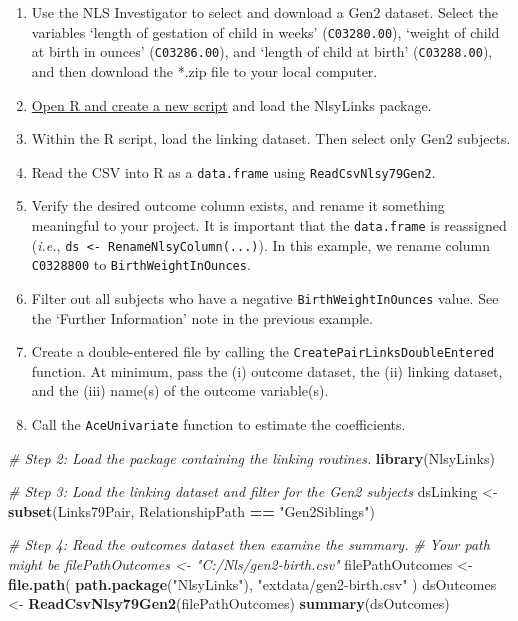 \documentclass[smallextended]{svjour3}       %
\newenvironment{Shaded}{\begin{snugshade}}{\end{snugshade}}
\newcommand{\CommentTok}[1]{\textcolor[rgb]{0.56,0.35,0.01}{\textit{#1}}}
\newcommand{\KeywordTok}[1]{\textcolor[rgb]{0.13,0.29,0.53}{\textbf{#1}}}
\newcommand{\NormalTok}[1]{#1}
\newcommand{\OperatorTok}[1]{\textcolor[rgb]{0.81,0.36,0.00}{\textbf{#1}}}
\newcommand{\StringTok}[1]{\textcolor[rgb]{0.31,0.60,0.02}{#1}}
\begin{document}
\begin{enumerate}
\def\labelenumi{\arabic{enumi}.}
\item
  Use the NLS Investigator to select and download a Gen2 dataset. Select
  the variables `length of gestation of child in weeks'
  (\texttt{C03280.00}), `weight of child at birth in ounces'
  (\texttt{C03286.00}), and `length of child at birth'
  (\texttt{C03288.00}), and then download the *.zip file to your local
  computer.
\item
  \protect\hyperlink{appendix-creating-and-saving-r-scripts}{Open R and
  create a new script} and load the NlsyLinks package.
\item
  Within the R script, load the linking dataset. Then select only Gen2
  subjects.
\item
  Read the CSV into R as a \texttt{data.frame} using
  \texttt{ReadCsvNlsy79Gen2}.
\item
  Verify the desired outcome column exists, and rename it something
  meaningful to your project. It is important that the
  \texttt{data.frame} is reassigned (\emph{i.e.},
  \texttt{ds\ \textless{}-\ RenameNlsyColumn(...)}). In this example, we
  rename column \texttt{C0328800} to \texttt{BirthWeightInOunces}.
\item
  Filter out all subjects who have a negative
  \texttt{BirthWeightInOunces} value. See the `Further Information' note
  in the previous example.
\item
  Create a double-entered file by calling the
  \texttt{CreatePairLinksDoubleEntered} function. At minimum, pass the
  (i) outcome dataset, the (ii) linking dataset, and the (iii) name(s)
  of the outcome variable(s).
\item
  Call the \texttt{AceUnivariate} function to estimate the coefficients.
\end{enumerate}

\begin{Shaded}
\begin{Highlighting}[]
\CommentTok{# Step 2: Load the package containing the linking routines.}
\KeywordTok{library}\NormalTok{(NlsyLinks)}

\CommentTok{# Step 3: Load the linking dataset and filter for the Gen2 subjects}
\NormalTok{dsLinking <-}\StringTok{ }\KeywordTok{subset}\NormalTok{(Links79Pair, RelationshipPath }\OperatorTok{==}\StringTok{ "Gen2Siblings"}\NormalTok{)}

\CommentTok{# Step 4: Read the outcomes dataset then examine the summary.}
\CommentTok{#   Your path might be filePathOutcomes <- "C:/Nls/gen2-birth.csv"}
\NormalTok{filePathOutcomes <-}\StringTok{ }\KeywordTok{file.path}\NormalTok{(}
  \KeywordTok{path.package}\NormalTok{(}\StringTok{"NlsyLinks"}\NormalTok{),}
  \StringTok{"extdata/gen2-birth.csv"}
\NormalTok{)}
\NormalTok{dsOutcomes <-}\StringTok{ }\KeywordTok{ReadCsvNlsy79Gen2}\NormalTok{(filePathOutcomes)}
\KeywordTok{summary}\NormalTok{(dsOutcomes)}
\end{Highlighting}
\end{Shaded}
\end{document}

